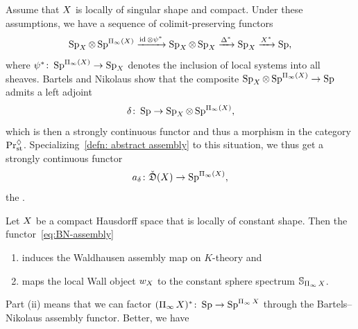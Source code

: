 Assume that $X$ is locally of singular shape and compact. Under these assumptions, we have a sequence of colimit-preserving functors
\[
  \operatorname{Sp}_{X}\otimes\operatorname{Sp}^{\operatorname{\Pi_\infty} (X )}\xrightarrow{\operatorname{id}\otimes\psi^*}
  \operatorname{Sp}_{X}\otimes \operatorname{Sp}_{X}\xrightarrow{\Delta^*}\operatorname{Sp}_{X}\xrightarrow{X^*}
  \operatorname{Sp}, 
\]
where $\psi^*\colon \operatorname{Sp}^{\operatorname{\Pi_\infty} (X )}\to\operatorname{Sp}_{X}$ denotes the inclusion of local systems into all sheaves. Bartels and Nikolaus show that the composite $\operatorname{Sp}_{X}\otimes\operatorname{Sp}^{\operatorname{\Pi_\infty} (X )}\to\operatorname{Sp}$ admits a left adjoint
\[
\delta\colon \operatorname{Sp}\to \operatorname{Sp}_{X}\otimes\operatorname{Sp}^{\operatorname{\Pi_\infty} (X )},
\]
which is then a strongly continuous functor and thus a morphism in the category $\mathrm{Pr}_{\mathrm{st}}^{\lozenge}$. Specializing~\cref{defn: abstract assembly} to this situation, we thus get a strongly continuous functor
\begin{equation}
  \label{eq:BN-assembly}
  a_\delta\colon\check{\mathfrak{D}} (X )\to \operatorname{Sp}^{\operatorname{\Pi_\infty} (X )},
\end{equation}
the .
\begin{thm}\label{thm: Bartels--Nikolaus geometric topology}
  Let $X$ be a compact Hausdorff space that is locally of constant shape.
  Then the functor~\eqref{eq:BN-assembly}
  \begin{enumerate}[label=(\roman*)]
  \item induces the Waldhausen assembly map on $K$-theory and
  \item maps the local Wall object $w_X$ to the constant sphere spectrum $\mathbb{S}_{\operatorname{\Pi_\infty} X}$.
  \end{enumerate}
\end{thm}
Part (ii) means that we can factor $(\operatorname{\Pi_\infty}X )^*\colon\operatorname{Sp}\to\operatorname{Sp}^{\operatorname{\Pi_\infty}X}$ through the Bartels--Nikolaus assembly functor. Better, we have
